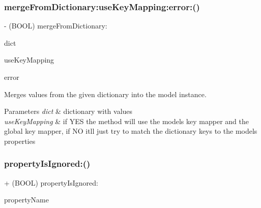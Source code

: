 \subsubsection{\texorpdfstring{merge\+From\+Dictionary\+:use\+Key\+Mapping\+:error\+:()}{mergeFromDictionary:useKeyMapping:error:()}}
{\footnotesize\ttfamily -\/ (B\+O\+OL) merge\+From\+Dictionary\+: \begin{DoxyParamCaption}\item[{(N\+S\+Dictionary $\ast$)}]{dict }\item[{useKeyMapping:(B\+O\+OL)}]{use\+Key\+Mapping }\item[{error:(N\+S\+Error $\ast$ \+\_\+\+\_\+autoreleasing $\ast$)}]{error }\end{DoxyParamCaption}}

Merges values from the given dictionary into the model instance. 
\begin{DoxyParams}{Parameters}
{\em dict} & dictionary with values \\
\hline
{\em use\+Key\+Mapping} & if Y\+ES the method will use the model\textquotesingle{}s key mapper and the global key mapper, if NO it\textquotesingle{}ll just try to match the dictionary keys to the model\textquotesingle{}s properties \\
\hline
\end{DoxyParams}
\mbox{\label{interface_o_p_t_l_y_j_s_o_n_model_a49b04a9bf083b74205921a22b5521ef6}} 
\subsubsection{\texorpdfstring{property\+Is\+Ignored\+:()}{propertyIsIgnored:()}}
{\footnotesize\ttfamily + (B\+O\+OL) property\+Is\+Ignored\+: \begin{DoxyParamCaption}\item[{(N\+S\+String $\ast$)}]{property\+Name }\end{DoxyParamCaption}}

